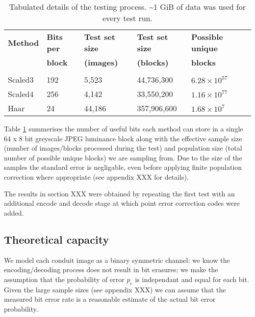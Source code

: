 \begin{table}[tbp]
  \begin{center}
        \begin{tabular}{l l l l l}
        \textbf{Method} &\textbf{Bits per} &\textbf{Test set size} & \textbf{Test set size} &\textbf{Possible unique} \\ 
            &\textbf{block} &\textbf{(images)} &\textbf{(blocks)} &\textbf{blocks} \\ [0.1ex] \hline \\ [-1.5ex]
        Scaled3	&192	&5,523	&44,736,300	& $6.28 \times 10^{57}$ \\
        Scaled4	&256	&4,142	&33,550,200	& $1.16 \times 10^{77}$ \\
        Haar	&24	&44,186	&357,906,600	& $1.68 \times 10^{7}$ \\
        \end{tabular}
        \caption{Tabulated details of the testing process. \textasciitilde 1 GiB of data was used for every test run.}
        \label{tab:img-test}
    \end{center}
\end{table}


Table \ref{tab:img-test} summerises the number of useful bits each method can store in a single 64 x 8 bit greyscale JPEG luminance block along with the effective sample size (number of images/blocks processed during the test) and population size (total number of possible unique blocks) we are sampling from. Due to the size of the samples the standard error is negligable, even before applying finite population correction where appropriate (see appendix XXX for details).

The results in section XXX were obtained by repeating the first test with an additional encode and decode stage at which point error correction codes were added.

\subsection{Theoretical capacity}

We model each conduit image as a binary symmetric channel: we know the encoding/decoding process does not result in bit erasures; we make the assumption that the probability of error $p_e$ is independant and equal for each bit. Given the large sample sizes (see appendix XXX) we can assume that the measured bit error rate is a reasonable estimate of the actual bit error probability.

